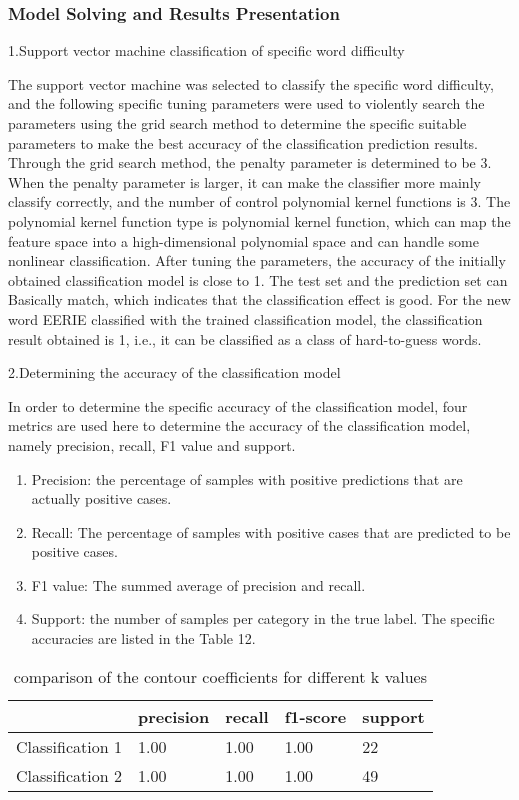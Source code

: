 \documentclass[12pt]{article}  %
\begin{document}
\subsubsection{Model Solving and Results Presentation}

1.Support vector machine classification of specific word difficulty

The support vector machine was selected to classify the specific word difficulty, and the following specific tuning parameters were used to violently search the parameters using the grid search method to determine the specific suitable parameters to make the best accuracy of the classification prediction results.
Through the grid search method, the penalty parameter is determined to be 3. When the penalty parameter is larger, it can make the classifier more mainly classify correctly, and the number of control polynomial kernel functions is 3. The polynomial kernel function type is polynomial kernel function, which can map the feature space into a high-dimensional polynomial space and can handle some nonlinear classification. After tuning the parameters, the accuracy of the initially obtained classification model is close to 1. The test set and the prediction set can 	Basically match, which indicates that the classification effect is good.
For the new word EERIE classified with the trained classification model, the classification result obtained is 1, i.e., it can be classified as a class of hard-to-guess words.

2.Determining the accuracy of the classification model

In order to determine the specific accuracy of the classification model, four metrics are used here to determine the accuracy of the classification model, namely precision, recall, F1 value and support.

\begin{enumerate}
	\item Precision: the percentage of samples with positive predictions that are actually positive cases.
	\item Recall: The percentage of samples with positive cases that are predicted to be positive cases.
	\item F1 value: The summed average of precision and recall.
	\item Support: the number of samples per category in the true label.
	The specific accuracies are listed in the Table 12.
\end{enumerate}

\begin{table}[hbp]
	\centering
	\label{tab:pagenum}
	\begin{tabular}{lllll}
		\toprule
		& precision &  recall & f1-score & support \\
		\midrule
		Classification 1  & 1.00 & 1.00 & 1.00 & 22\\
		\midrule
		Classification 2  & 1.00 & 1.00 & 1.00 & 49\\	
		\bottomrule
	\end{tabular}
	\caption{comparison of the contour coefficients for different k values}
\end{table}
\end{document}
